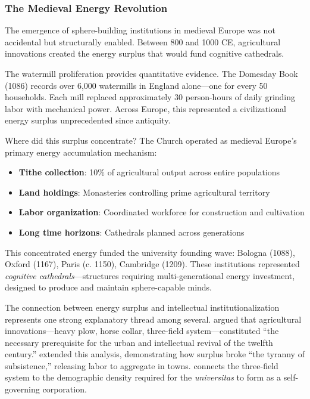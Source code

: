 \subsubsection{The Medieval Energy Revolution}

The emergence of sphere-building institutions in medieval Europe was not accidental but structurally enabled. Between 800 and 1000 CE, agricultural innovations created the energy surplus that would fund cognitive cathedrals.

The watermill proliferation provides quantitative evidence. The Domesday Book (1086) records over 6,000 watermills in England alone---one for every 50 households. Each mill replaced approximately 30 person-hours of daily grinding labor with mechanical power. Across Europe, this represented a civilizational energy surplus unprecedented since antiquity.

Where did this surplus concentrate? The Church operated as medieval Europe's primary energy accumulation mechanism:

\begin{itemize}
    \item \textbf{Tithe collection}: 10\% of agricultural output across entire populations
    \item \textbf{Land holdings}: Monasteries controlling prime agricultural territory
    \item \textbf{Labor organization}: Coordinated workforce for construction and cultivation
    \item \textbf{Long time horizons}: Cathedrals planned across generations
\end{itemize}

This concentrated energy funded the university founding wave: Bologna (1088), Oxford (1167), Paris (c. 1150), Cambridge (1209). These institutions represented \textit{cognitive cathedrals}---structures requiring multi-generational energy investment, designed to produce and maintain sphere-capable minds.

The connection between energy surplus and intellectual institutionalization represents one strong explanatory thread among several. \citet{white1962} argued that agricultural innovations---heavy plow, horse collar, three-field system---constituted ``the necessary prerequisite for the urban and intellectual revival of the twelfth century.'' \citet{lopez1976} extended this analysis, demonstrating how surplus broke ``the tyranny of subsistence,'' releasing labor to aggregate in towns. \citet{grant1996} connects the three-field system to the demographic density required for the \textit{universitas} to form as a self-governing corporation.

